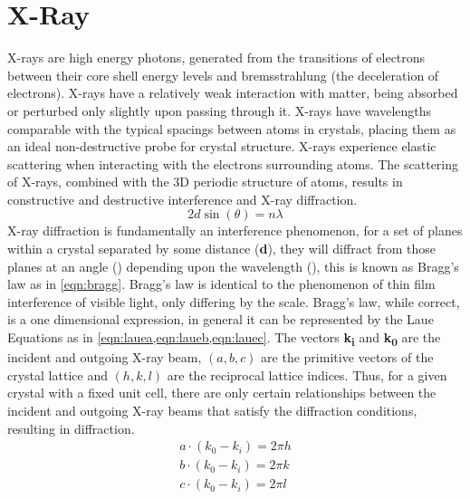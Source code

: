 \section{X-Ray}
X-rays are high energy photons, generated from the transitions of electrons between their core shell energy levels and bremsstrahlung (the deceleration of electrons).
X-rays have a relatively weak interaction with matter, being absorbed or perturbed only slightly upon passing through it.
X-rays have wavelengths comparable with the typical spacings between atoms in crystals, placing them as an ideal non-destructive probe for crystal structure.
X-rays experience elastic scattering when interacting with the electrons surrounding atoms.
The scattering of X-rays, combined with the 3D periodic structure of atoms, results in constructive and destructive interference and X-ray diffraction\cite{zavalij}.
\begin{equation}
 \label{eqn:bragg}
 2d \sin(\theta) = n \lambda
\end{equation}
X-ray diffraction is fundamentally an interference phenomenon, for a set of planes within a crystal separated by some distance (\textbf{d}), they will diffract from those planes at an angle (\textbf{\straighttheta}) depending upon the wavelength (\textbf{\textlambda{}}), this is known as Bragg's law as in \cref{eqn:bragg}.
Bragg's law is identical to the phenomenon of thin film interference of visible light, only differing by the scale.
Bragg's law, while correct, is a one dimensional expression, in general it can be represented by the Laue Equations as in \cref{eqn:lauea,eqn:laueb,eqn:lauec}.
The vectors \textbf{k\textsubscript{i}} and \textbf{k\textsubscript{0}} are the incident and outgoing X-ray beam, \((a,b,c)\) are the primitive vectors of the crystal lattice and \((h,k,l)\) are the reciprocal lattice indices.
Thus, for a given crystal with a fixed unit cell, there are only certain relationships between the incident and outgoing X-ray beams that satisfy the diffraction conditions, resulting in diffraction.
\begin{align}
 a \cdot (k_0 - k_i) = 2 \pi h \label{eqn:lauea} \\
 b \cdot (k_0 - k_i) = 2 \pi k \label{eqn:laueb} \\
 c \cdot (k_0 - k_i) = 2 \pi l \label{eqn:lauec}
\end{align}

